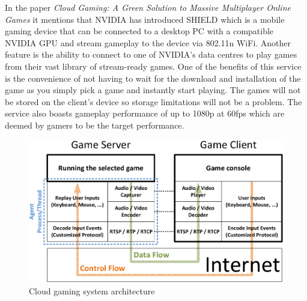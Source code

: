 In the paper \textit{Cloud Gaming: A Green Solution to Massive Multiplayer Online Games} \cite{chuah2014cloud} it mentions that NVIDIA has introduced SHIELD which is a mobile gaming device that can be connected to a desktop PC with a compatible NVIDIA GPU and stream gameplay to the device via 802.11n WiFi. Another feature is the ability to connect to one of NVIDIA's data centres to play games from their vast library of stream-ready games. One of the benefits of this service is the convenience of not having to wait for the download and installation of the game as you simply pick a game and instantly start playing. The games will not be stored on the client's device so storage limitations will not be a problem. The service also boasts gameplay performance of up to 1080p at 60fps which are deemed by gamers to be the target performance.

\begin{figure}[h]
 \includegraphics[width=\linewidth]{images/arch.png}
 \caption{Cloud gaming system architecture}
 \label{fig:arch}
\end{figure}

